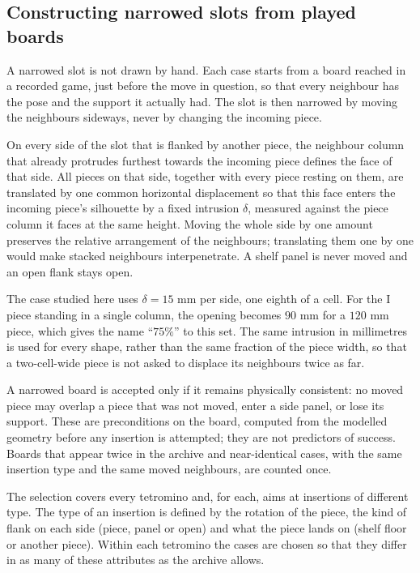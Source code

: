 \subsection{Constructing narrowed slots from played boards}

A narrowed slot is not drawn by hand. Each case starts from a board reached in a recorded game, just before the move in question, so that every neighbour has the pose and the support it actually had. The slot is then narrowed by moving the neighbours sideways, never by changing the incoming piece.

On every side of the slot that is flanked by another piece, the neighbour column that already protrudes furthest towards the incoming piece defines the face of that side. All pieces on that side, together with every piece resting on them, are translated by one common horizontal displacement so that this face enters the incoming piece's silhouette by a fixed intrusion $\delta$, measured against the piece column it faces at the same height. Moving the whole side by one amount preserves the relative arrangement of the neighbours; translating them one by one would make stacked neighbours interpenetrate. A shelf panel is never moved and an open flank stays open.

The case studied here uses $\delta=15$ mm per side, one eighth of a cell. For the I piece standing in a single column, the opening becomes $90$ mm for a $120$ mm piece, which gives the name ``$75\%$'' to this set. The same intrusion in millimetres is used for every shape, rather than the same fraction of the piece width, so that a two-cell-wide piece is not asked to displace its neighbours twice as far.

A narrowed board is accepted only if it remains physically consistent: no moved piece may overlap a piece that was not moved, enter a side panel, or lose its support. These are preconditions on the board, computed from the modelled geometry before any insertion is attempted; they are not predictors of success. Boards that appear twice in the archive and near-identical cases, with the same insertion type and the same moved neighbours, are counted once.

The selection covers every tetromino and, for each, aims at insertions of different type. The type of an insertion is defined by the rotation of the piece, the kind of flank on each side (piece, panel or open) and what the piece lands on (shelf floor or another piece). Within each tetromino the cases are chosen so that they differ in as many of these attributes as the archive allows.


